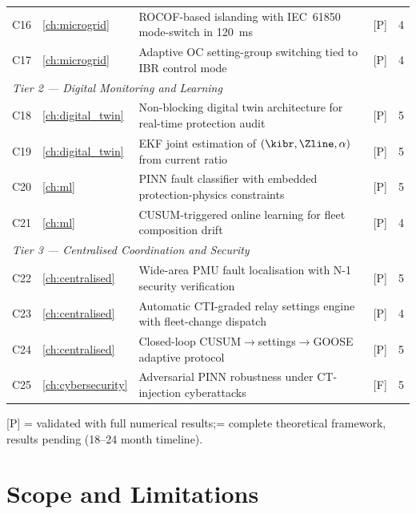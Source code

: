 \begin{table}[htbp]
\begin{tabularx}{\textwidth}{@{}clp{8cm}cc@{}}
C16 & \ref{ch:microgrid}
  & ROCOF-based islanding with IEC~61850 mode-switch in 120~ms
  & [P] & 4 \\
C17 & \ref{ch:microgrid}
  & Adaptive OC setting-group switching tied to IBR control mode
  & [P] & 4 \\
\midrule
\multicolumn{5}{l}{\textit{Tier 2 --- Digital Monitoring and Learning}} \\
C18 & \ref{ch:digital_twin}
  & Non-blocking digital twin architecture for real-time protection audit
  & [P] & 5 \\
C19 & \ref{ch:digital_twin}
  & EKF joint estimation of $(\kibr, \Zline, \alpha)$ from current ratio
  & [P] & 5 \\
C20 & \ref{ch:ml}
  & PINN fault classifier with embedded protection-physics constraints
  & [P] & 5 \\
C21 & \ref{ch:ml}
  & CUSUM-triggered online learning for fleet composition drift
  & [P] & 4 \\
\midrule
\multicolumn{5}{l}{\textit{Tier 3 --- Centralised Coordination and Security}} \\
C22 & \ref{ch:centralised}
  & Wide-area PMU fault localisation with N-1 security verification
  & [P] & 5 \\
C23 & \ref{ch:centralised}
  & Automatic CTI-graded relay settings engine with fleet-change dispatch
  & [P] & 4 \\
C24 & \ref{ch:centralised}
  & Closed-loop CUSUM$\to$settings$\to$GOOSE adaptive protocol
  & [P] & 5 \\
C25 & \ref{ch:cybersecurity}
  & Adversarial PINN robustness under CT-injection cyberattacks
  & [F] & 5 \\
\bottomrule
\end{tabularx}
\vspace{2pt}
{\footnotesize [P] = validated with full numerical results;\;
[F] = complete theoretical framework, results pending (18--24 month timeline).}
\end{table}

\section{Scope and Limitations}
\label{sec:ch1_scope}

